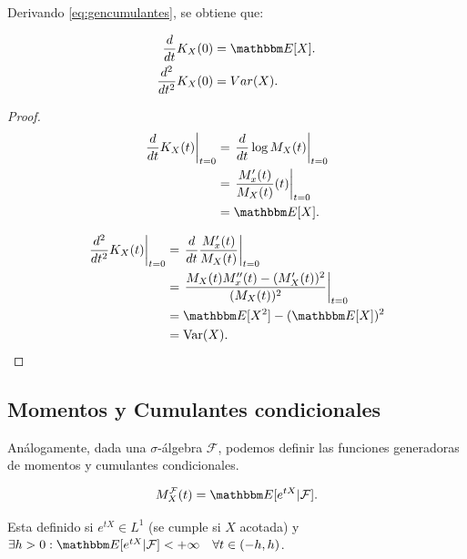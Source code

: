 \begin{property}\label{obs:gencum}
Derivando \eqref{eq:gencumulantes}, se obtiene que:


\begin{align}
    \frac{d}{dt} K_X(0) &= \E{X}. \\
    \frac{d^2}{dt^2} K_X(0) &= Var(X).
\end{align}

\end{property}

\begin{proof}
    \begin{align}
    \left. \frac{d}{dt} K_X(t) \right|_{t=0} &= \left. \frac{d}{dt} \operatorname{log} M_X(t) \right|_{t=0} \nonumber \\
                        &= \left. \frac{M_x'(t)}{M_X(t)}(t) \right|_{t=0} \nonumber\\
                        &= \E{X} \nonumber.
\end{align}

\begin{align}
    \left. \frac{d^2}{dt^2} K_X(t) \right|_{t=0} &= \left. \frac{d}{dt} \frac{M_x'(t)}{M_X(t)} \right|_{t=0} \nonumber \\
                        &= \left. \frac{M_X(t)M_x''(t) - (M_X'(t))^2}{(M_X(t))^2} \right|_{t=0} \label{eq:dt2KX}\\
                        &= \E{X^2} - (\E{X})^2 \nonumber \\
                        &= \Var{X}. \qedhere
\end{align}
\end{proof}

\subsection{Momentos y Cumulantes condicionales}

Análogamente, dada una \(\sigma\)-álgebra  \(\mathcal{F}\), podemos definir las funciones generadoras de momentos y cumulantes condicionales.

\begin{definition}

    \begin{equation} \label{eq:momentcond}
    M_X^\mathcal{F}(t) = \E{e^{tX}|\mathcal{F}}.
    \end{equation}

    Esta definido si \(e^{tX} \in L^1\) (se cumple si \(X\) acotada) y \(\exists h>0 : \E{e^{tX}|\mathcal{F}}<+\infty \quad \forall t \in (-h,h)\).
\end{definition}


